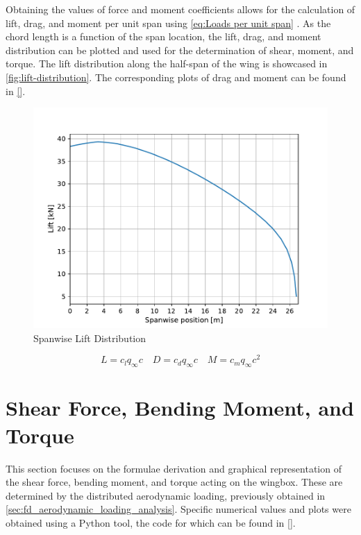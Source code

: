 \noindent Obtaining the values of force and moment coefficients allows for the calculation of lift, drag, and moment per unit span using \autoref{eq:Loads per unit span} \cite{Anderson2016IntroductionFlight} . As the chord length is a function of the span location, the lift, drag, and moment distribution can be plotted and used for the determination of shear, moment, and torque. The lift distribution along the half-span of the wing is showcased in \autoref{fig:lift-distribution}. The corresponding plots of drag and moment can be found in \autoref{}. 
\begin{figure}[H]
    \centering
    \includegraphics[width=0.7\linewidth]{figures/Lift distribution.pdf}
    \caption{Spanwise Lift Distribution}
    \label{fig:lift-distribution}
\end{figure}

\begin{equation}
    L=c_l q_\infty c \quad
    D=c_d q_\infty c \quad
    M=c_m q_\infty c^2
    \label{eq:Loads per unit span}
\end{equation}

\section{Shear Force, Bending Moment, and Torque}   \label{sec:fd_shear_moment_torque}

This section focuses on the formulae derivation and graphical representation of the shear force, bending moment, and torque acting on the wingbox. These are determined by the distributed aerodynamic loading, previously obtained in \autoref{sec:fd_aerodynamic_loading_analysis}. Specific numerical values and plots were obtained using a Python tool, the code for which can be found in \autoref{}.

